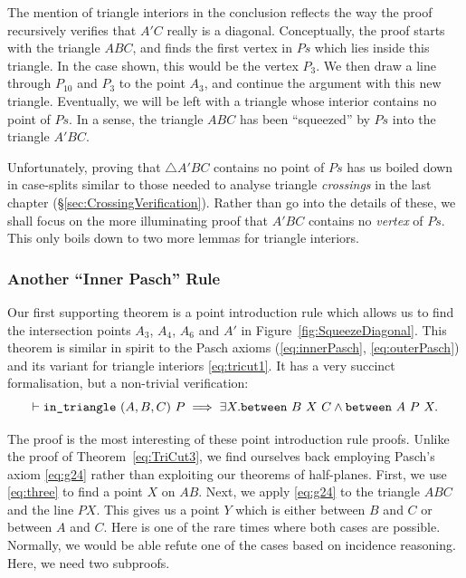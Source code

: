 The mention of triangle interiors in the conclusion reflects the way the proof recursively verifies that $A'C$ really is a diagonal. Conceptually, the proof starts with the triangle $ABC$, and finds the first vertex in $Ps$ which lies inside this triangle. In the case shown, this would be the vertex $P_3$. We then draw a line through $P_{10}$ and $P_3$ to the point $A_3$, and continue the argument with this new triangle. Eventually, we will be left with a triangle whose interior contains no point of $Ps$. In a sense, the triangle $ABC$ has been ``squeezed'' by $Ps$ into the triangle $A'BC$.

Unfortunately, proving that $\triangle A'BC$ contains no point of $Ps$ has us boiled down in case-splits similar to those needed to analyse triangle \emph{crossings} in the last chapter (\S\ref{sec:CrossingVerification}). Rather than go into the details of these, we shall focus on the more illuminating proof that $A'BC$ contains no \emph{vertex} of $Ps$. This only boils down to two more lemmas for triangle interiors.

\subsubsection{Another ``Inner Pasch'' Rule}
Our first supporting theorem is a point introduction rule which allows us to find the intersection points $A_3$, $A_4$, $A_6$ and $A'$ in Figure~\ref{fig:SqueezeDiagonal}. This theorem is similar in spirit to the Pasch axioms (\ref{eq:innerPasch}, \ref{eq:outerPasch}) and its variant for triangle interiors \eqref{eq:tricut1}. It has a very succinct formalisation, but a non-trivial verification:
\begin{equation}\label{eq:TriCut3}
\vdash\texttt{in\_triangle}\ (A,B,C)\ P \implies \exists X. \texttt{between}\ B\ X\ C \wedge \texttt{between}\ A\ P\ X.
\end{equation}

The proof is the most interesting of these point introduction rule proofs. Unlike the proof of Theorem~\ref{eq:TriCut3}, we find ourselves back employing Pasch's axiom \eqref{eq:g24} rather than exploiting our theorems of half-planes. First, we use \ref{eq:three} to find a point $X$ on $AB$. Next, we apply \eqref{eq:g24} to the triangle $ABC$ and the line $PX$. This gives us a point $Y$ which is either between $B$ and $C$ or between $A$ and $C$. Here is one of the rare times where both cases are possible. Normally, we would be able refute one of the cases based on incidence reasoning. Here, we need two subproofs.

